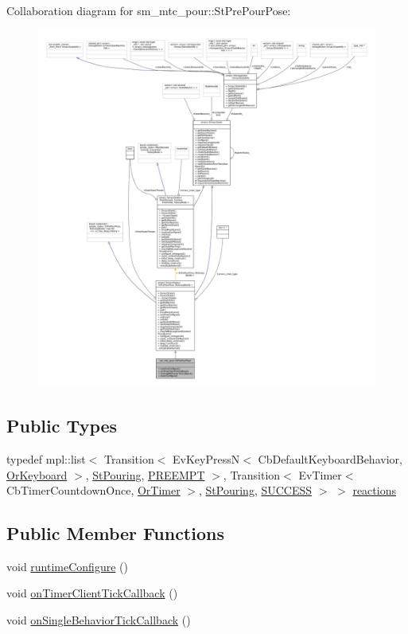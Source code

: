 Collaboration diagram for sm\+\_\+mtc\+\_\+pour\+:\+:St\+Pre\+Pour\+Pose\+:
\nopagebreak
\begin{figure}[H]
\begin{center}
\leavevmode
\includegraphics[width=350pt]{structsm__mtc__pour_1_1StPrePourPose__coll__graph}
\end{center}
\end{figure}
\subsection*{Public Types}
\begin{DoxyCompactItemize}
\item 
typedef mpl\+::list$<$ Transition$<$ Ev\+Key\+PressN$<$ Cb\+Default\+Keyboard\+Behavior, \hyperlink{classsm__mtc__pour_1_1OrKeyboard}{Or\+Keyboard} $>$, \hyperlink{structsm__mtc__pour_1_1StPouring}{St\+Pouring}, \hyperlink{classPREEMPT}{P\+R\+E\+E\+M\+PT} $>$, Transition$<$ Ev\+Timer$<$ Cb\+Timer\+Countdown\+Once, \hyperlink{classsm__mtc__pour_1_1OrTimer}{Or\+Timer} $>$, \hyperlink{structsm__mtc__pour_1_1StPouring}{St\+Pouring}, \hyperlink{classSUCCESS}{S\+U\+C\+C\+E\+SS} $>$ $>$ \hyperlink{structsm__mtc__pour_1_1StPrePourPose_aa71925a594abf62a70eb2860a7961d57}{reactions}
\end{DoxyCompactItemize}
\subsection*{Public Member Functions}
\begin{DoxyCompactItemize}
\item 
void \hyperlink{structsm__mtc__pour_1_1StPrePourPose_a0285e30b8310caf45506354169a4336b}{runtime\+Configure} ()
\item 
void \hyperlink{structsm__mtc__pour_1_1StPrePourPose_af67f48d0283f430b0d750b781479f85b}{on\+Timer\+Client\+Tick\+Callback} ()
\item 
void \hyperlink{structsm__mtc__pour_1_1StPrePourPose_a299e9a7f1939536f57e8c3976bc3d18e}{on\+Single\+Behavior\+Tick\+Callback} ()
\end{DoxyCompactItemize}
